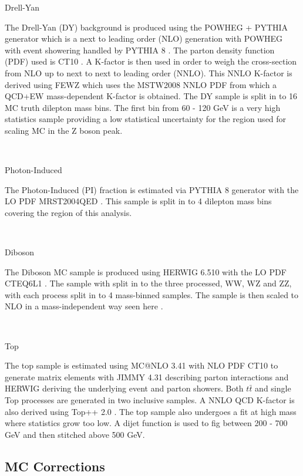    {\bf\raggedright Drell-Yan}

   {\raggedright The Drell-Yan (DY) background is produced using the POWHEG + PYTHIA generator which is a next to leading order (NLO) generation with POWHEG \cite{} with event showering handled by PYTHIA 8 \cite{}. The parton density function (PDF) used is CT10 \cite{}. A K-factor is then used in order to weigh the cross-section from NLO up to next to next to leading order (NNLO). This NNLO K-factor is derived using FEWZ \cite{} which uses the MSTW2008 NNLO PDF \cite{} from which a QCD+EW mass-dependent K-factor is obtained. The DY sample is split in to 16 MC truth dilepton mass bins. The first bin from 60 - 120 GeV is a very high statistics sample providing a low statistical uncertainty for the region used for scaling MC in the Z boson peak.} \\


   {\bf\raggedright Photon-Induced}

   {\raggedright The Photon-Induced (PI) fraction is estimated via PYTHIA 8 \cite{} generator with the LO PDF MRST2004QED \cite{}. This sample is split in to 4 dilepton mass bins covering the region of this analysis.}\\


   {\bf\raggedright Diboson}

   {\raggedright The Diboson MC sample is produced using HERWIG 6.510 \cite{} with the LO PDF CTEQ6L1 \cite{}. The sample with split in to the three processed, WW, WZ and ZZ, with each process split in to 4 mass-binned samples. The sample is then scaled to NLO in a mass-independent way seen here \cite{}.}\\

   {\bf\raggedright Top}

   {\raggedright The top sample is estimated using MC@NLO 3.41 \cite{} with NLO PDF CT10 \cite{} to generate matrix elements with JIMMY 4.31 \cite{} describing parton interactions and HERWIG \cite{} deriving the underlying event and parton showers. Both $t\bar{t}$ and single Top processes are generated in two inclusive samples. A NNLO QCD K-factor is also derived using Top++ 2.0 \cite{}. The top sample also undergoes a fit at high mass where statistics grow too low. A dijet function is used to fig between 200 - 700 GeV and then stitched above 500 GeV. }


\subsection{MC Corrections}
   \label{sec:correc}

